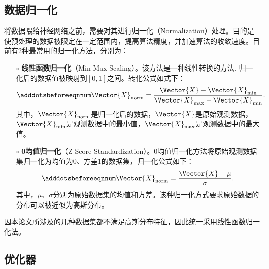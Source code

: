 \subsection{数据归一化}\label{sec:ml_scaler}

将数据喂给神经网络之前，需要对其进行归一化（Normalization）处理。目的是使预处理的数据被限定在一定范围内，提高算法精度，并加速算法的收敛速度。目前有2种最常用的归一化方法，分别为：
\begin{enumerate}
  \item[$\circ$] \textbf{线性函数归一化}（Min-Max Scaling）。该方法是一种线性转换的方法, 归一化后的数据值被映射到$[0,1]$之间。转化公式如式下：
  \begin{equation}\adddotsbeforeeqnnum 
    \label{eq:ml_scale_min_max}
    \Vector{X}_{\text{norm}}=\frac{\Vector{X}-\Vector{X}_{\text{min}}}{\Vector{X}_{\text{max}}-\Vector{X}_{\text{min}}}.
  \end{equation}
  其中，$\Vector{X}_{\text{norm}}$是归一化后的数据，$\Vector{X}$是原始观测数据，$\Vector{X}_{\text{min}}$是观测数据中的最小值，$\Vector{X}_{\text{max}}$是观测数据中的最大值。
  \item[$\circ$] \textbf{0均值归一化}（Z-Score Standardization）。0均值归一化方法将原始观测数据集归一化为均值为0、方差1的数据集，归一化公式如下：
  \begin{equation}\adddotsbeforeeqnnum 
    \label{eq:ml_scale_z_score}
    \Vector{X}_{\text{norm}}=\frac{\Vector{X}-\mu}{\sigma}.
  \end{equation}
  其中，$\mu$、$\sigma$分别为原始数据集的均值和方差。该种归一化方式要求原始数据的分布可以被近似为高斯分布。
\end{enumerate}

因本论文所涉及的几种数据集都不满足高斯分布特征，因此统一采用线性函数归一化法。

\subsection{优化器}\label{sec:ml_optimizer}

